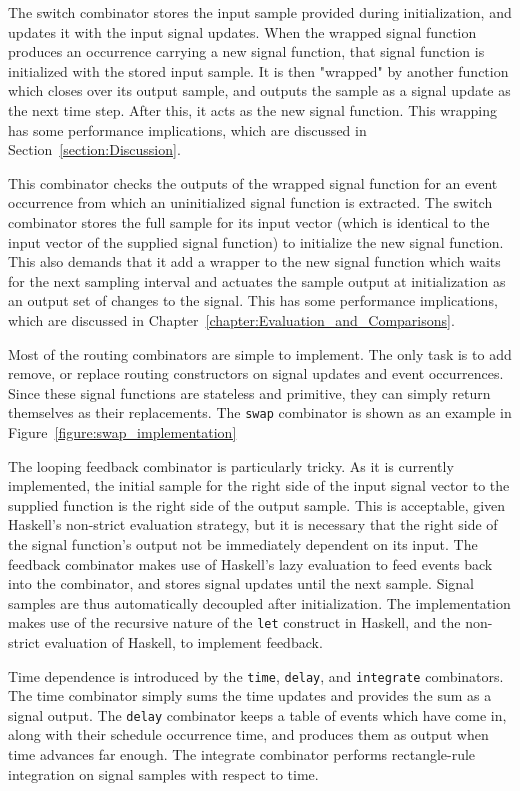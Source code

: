 The switch combinator stores the input sample provided during initialization,
and updates it with the input signal updates. When the wrapped signal function
produces an occurrence carrying a new signal function, that signal function is
initialized with the stored input sample. It is then "wrapped" by another
function which closes over its output sample, and outputs the sample as a signal
update as the next time step. After this, it acts as the new signal function.
This wrapping has some performance implications, which are discussed in Section~\ref{section:Discussion}.

This combinator checks the outputs of the wrapped
signal function for an event occurrence from which an uninitialized signal
function is extracted. The switch combinator stores the full sample
for its input vector (which is identical to the input vector of the supplied
signal function) to initialize the new signal function. This also demands that
it add a wrapper to the new signal function which waits for the next sampling
interval and actuates the sample output at initialization as an output set
of changes to the signal. This has some performance implications, which are
discussed in Chapter~\ref{chapter:Evaluation_and_Comparisons}.

Most of the routing combinators are simple to implement. The only task is to add
remove, or replace routing constructors on signal updates and event occurrences.
Since these signal functions are stateless and primitive, they can simply
return themselves as their replacements. The {\tt swap} combinator is shown as
an example in Figure~\ref{figure:swap_implementation}

The looping feedback combinator is particularly tricky. As it is currently
implemented, the initial sample for the right side of the input signal vector to
the supplied function is the right side of the output sample. This is acceptable,
given Haskell's non-strict evaluation strategy, but it is necessary that the
right side of the signal function's output not be immediately dependent on its
input. The feedback combinator makes use of Haskell's lazy evaluation to
feed events back into the combinator, and stores signal updates until the next
sample. Signal samples are thus automatically decoupled after initialization.
The implementation makes use of the recursive nature of the {\tt let} construct
in Haskell, and the non-strict evaluation of Haskell, to implement feedback.

Time dependence is introduced by the {\tt time}, {\tt delay}, and {\tt integrate}
combinators. The time combinator simply sums the time updates and provides the
sum as a signal output. The {\tt delay} combinator keeps a table of events
which have come in, along with their schedule occurrence time, and produces
them as output when time advances far enough. The integrate combinator performs
rectangle-rule integration on signal samples with respect to time.

